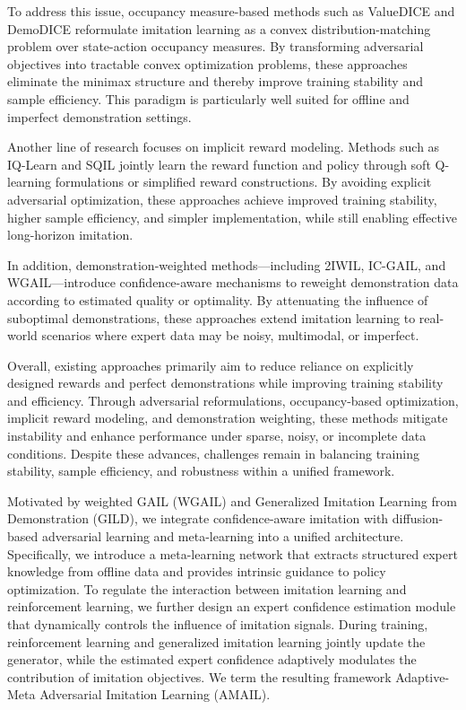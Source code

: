 \documentclass[lettersize,journal]{IEEEtran}
\begin{document}
To address this issue, occupancy measure-based methods such as ValueDICE and DemoDICE reformulate imitation learning as a convex distribution-matching problem over state-action occupancy measures. By transforming adversarial objectives into tractable convex optimization problems, these approaches eliminate the minimax structure and thereby improve training stability and sample efficiency. This paradigm is particularly well suited for offline and imperfect demonstration settings.

Another line of research focuses on implicit reward modeling. Methods such as IQ-Learn and SQIL jointly learn the reward function and policy through soft Q-learning formulations or simplified reward constructions. By avoiding explicit adversarial optimization, these approaches achieve improved training stability, higher sample efficiency, and simpler implementation, while still enabling effective long-horizon imitation.

In addition, demonstration-weighted methods—including 2IWIL, IC-GAIL, and WGAIL—introduce confidence-aware mechanisms to reweight demonstration data according to estimated quality or optimality. By attenuating the influence of suboptimal demonstrations, these approaches extend imitation learning to real-world scenarios where expert data may be noisy, multimodal, or imperfect.

Overall, existing approaches primarily aim to reduce reliance on explicitly designed rewards and perfect demonstrations while improving training stability and efficiency. Through adversarial reformulations, occupancy-based optimization, implicit reward modeling, and demonstration weighting, these methods mitigate instability and enhance performance under sparse, noisy, or incomplete data conditions. Despite these advances, challenges remain in balancing training stability, sample efficiency, and robustness within a unified framework.

Motivated by weighted GAIL (WGAIL) and Generalized Imitation Learning from Demonstration (GILD), we integrate confidence-aware imitation with diffusion-based adversarial learning and meta-learning into a unified architecture. Specifically, we introduce a meta-learning network that extracts structured expert knowledge from offline data and provides intrinsic guidance to policy optimization. To regulate the interaction between imitation learning and reinforcement learning, we further design an expert confidence estimation module that dynamically controls the influence of imitation signals. During training, reinforcement learning and generalized imitation learning jointly update the generator, while the estimated expert confidence adaptively modulates the contribution of imitation objectives. We term the resulting framework Adaptive-Meta Adversarial Imitation Learning (AMAIL).
\end{document}
